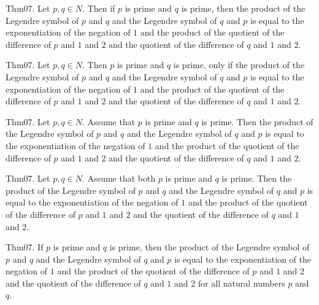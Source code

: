 \documentclass{article}
\begin{document}
Thm07. Let $p , q \in N$. Then if $p$ is prime and $q$ is prime, then the product of the Legendre symbol of $p$ and $q$ and the Legendre symbol of $q$ and $p$ is equal to the exponentiation of the negation of $1$ and the product of the quotient of the difference of $p$ and $1$ and $2$ and the quotient of the difference of $q$ and $1$ and $2$.

Thm07. Let $p , q \in N$. Then $p$ is prime and $q$ is prime, only if the product of the Legendre symbol of $p$ and $q$ and the Legendre symbol of $q$ and $p$ is equal to the exponentiation of the negation of $1$ and the product of the quotient of the difference of $p$ and $1$ and $2$ and the quotient of the difference of $q$ and $1$ and $2$.

Thm07. Let $p , q \in N$. Assume that $p$ is prime and $q$ is prime. Then the product of the Legendre symbol of $p$ and $q$ and the Legendre symbol of $q$ and $p$ is equal to the exponentiation of the negation of $1$ and the product of the quotient of the difference of $p$ and $1$ and $2$ and the quotient of the difference of $q$ and $1$ and $2$.

Thm07. Let $p , q \in N$. Assume that both $p$ is prime and $q$ is prime. Then the product of the Legendre symbol of $p$ and $q$ and the Legendre symbol of $q$ and $p$ is equal to the exponentiation of the negation of $1$ and the product of the quotient of the difference of $p$ and $1$ and $2$ and the quotient of the difference of $q$ and $1$ and $2$.

Thm07. If $p$ is prime and $q$ is prime, then the product of the Legendre symbol of $p$ and $q$ and the Legendre symbol of $q$ and $p$ is equal to the exponentiation of the negation of $1$ and the product of the quotient of the difference of $p$ and $1$ and $2$ and the quotient of the difference of $q$ and $1$ and $2$ for all natural numbers $p$ and $q$.
\end{document}
